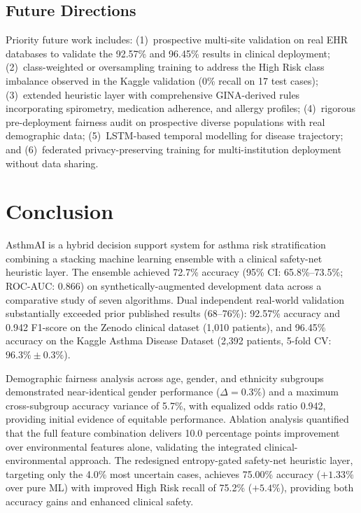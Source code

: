 \documentclass[11pt,a4paper]{article}
\begin{document}
\subsection{Future Directions}

Priority future work includes: (1)~prospective multi-site validation on real EHR
databases to validate the 92.57\% and 96.45\% results in clinical deployment; (2)~class-weighted or oversampling training to address the High Risk class imbalance
observed in the Kaggle validation (0\% recall on 17 test cases); (3)~extended
heuristic layer with comprehensive GINA-derived rules incorporating spirometry,
medication adherence, and allergy profiles; (4)~rigorous pre-deployment fairness
audit on prospective diverse populations with real demographic data; (5)~LSTM-based
temporal modelling for disease trajectory; and (6)~federated privacy-preserving
training for multi-institution deployment without data sharing.

\section{Conclusion}

AsthmAI is a hybrid decision support system for asthma risk stratification combining a
stacking machine learning ensemble with a clinical safety-net heuristic layer. The
ensemble achieved 72.7\% accuracy (95\% CI: 65.8\%--73.5\%; ROC-AUC: 0.866) on
synthetically-augmented development data across a comparative study of seven algorithms.
Dual independent real-world validation substantially exceeded prior published results
(68--76\%): 92.57\% accuracy and 0.942 F1-score on the Zenodo clinical dataset
(1,010 patients), and 96.45\% accuracy on the Kaggle Asthma Disease Dataset
(2,392 patients, 5-fold CV: $96.3\% \pm 0.3\%$).

Demographic fairness analysis across age, gender, and ethnicity subgroups demonstrated
near-identical gender performance ($\Delta = 0.3\%$) and a maximum cross-subgroup
accuracy variance of 5.7\%, with equalized odds ratio 0.942, providing initial
evidence of equitable performance. Ablation analysis quantified that the full
feature combination delivers 10.0 percentage points improvement over environmental
features alone, validating the integrated clinical-environmental approach. The
redesigned entropy-gated safety-net heuristic layer, targeting only the 4.0\%
most uncertain cases, achieves 75.00\% accuracy ($+1.33\%$ over pure ML) with
improved High Risk recall of 75.2\% ($+5.4\%$), providing both accuracy gains
and enhanced clinical safety.
\end{document}
